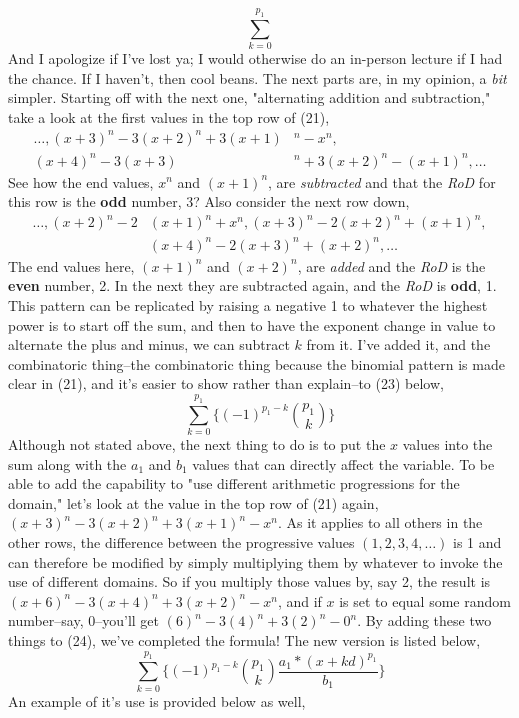 \documentclass[12pt, letterpaper]{report}
\begin{document}
\begin{equation}\sum_{k=0}^{p_{1}}\end{equation}
And I apologize if I've lost ya; I would otherwise do an in-person lecture if I had the chance. If I haven't, then cool beans. The next parts are, in my opinion, a \textit{bit} simpler. Starting off with the next one, "alternating addition and subtraction," take a look at the first values in the top row of (21),
\begin{equation*}
\begin{split}
\dots, (x+3)^n-3(x+2)^n+3(x+1)&^n-x^n,  \\
(x+4)^n-3(x+3)&^n+3(x+2)^n-(x+1)^n, \dots
\end{split}
\end{equation*}
See how the end values, $x^n$ and $(x+1)^n$, are \textit{subtracted} and that the \textit{RoD} for this row is the \textbf{odd} number, 3? Also consider the next row down,
\begin{equation*}
\begin{split}
\dots, (x+2)^n-2&(x+1)^n+x^n, (x+3)^n-2(x+2)^n+(x+1)^n, \\
&(x+4)^n-2(x+3)^n+(x+2)^n, \dots
\end{split}
\end{equation*}
The end values here, $(x+1)^n$ and $(x+2)^n$, are \textit{added} and the \textit{RoD} is the \textbf{even} number, 2. In the next they are subtracted again, and the \textit{RoD} is \textbf{odd}, 1. This pattern can be replicated by raising a negative 1 to whatever the highest power is to start off the sum, and then to have the exponent change in value to alternate the plus and minus, we can subtract $k$ from it. I've added it, and the combinatoric thing--the combinatoric thing because the binomial pattern is made clear in (21), and it's easier to show rather than explain--to (23) below,
\begin{equation}\sum_{k=0}^{p_{1}}\{ (-1)^{p_{1}-k}\binom{p_{1}}{k}\}\end{equation}
Although not stated above, the next thing to do is to put the $x$ values into the sum along with the $a_{1}$ and $b_{1}$ values that can directly affect the variable. To be able to add the capability to "use different arithmetic progressions for the domain," let's look at the value in the top row of (21) again, $(x+3)^n-3(x+2)^n+3(x+1)^n-x^n$. As it applies to all others in the other rows, the difference between the progressive values $(1, 2, 3, 4, \dots)$ is 1 and can therefore be modified by simply multiplying them by whatever to invoke the use of different domains. So if you multiply those values by, say 2, the result is $(x+6)^n-3(x+4)^n+3(x+2)^n-x^n$, and if $x$ is set to equal some random number--say, 0--you'll get $(6)^n-3(4)^n+3(2)^n-0^n$. By adding these two things to (24), we've completed the formula! The new version is listed below,
\begin{equation}\sum_{k=0}^{p_{1}}\{ (-1)^{p_{1}-k}\binom{p_{1}}{k}\frac{a_{1}*(x+kd)^{p_{1}}}{b_{1}}\}\end{equation}
An example of it's use is provided below as well, \newline
\end{document}
